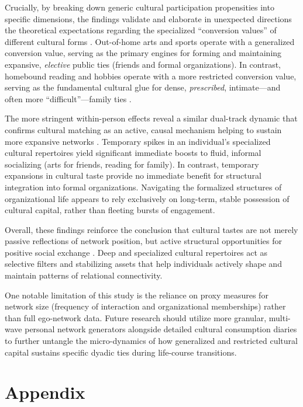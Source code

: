 \documentclass[
]{article}
\begin{document}
Crucially, by breaking down generic cultural participation propensities into specific dimensions, the findings validate and elaborate in unexpected directions the theoretical expectations regarding the specialized ``conversion values'' of different cultural forms \citep{lizardo2011, cebula2024structure-f21}. Out-of-home arts and sports operate with a generalized conversion value, serving as the primary engines for forming and maintaining expansive, \emph{elective} public ties (friends and formal organizations). In contrast, homebound reading and hobbies operate with a more restricted conversion value, serving as the fundamental cultural glue for dense, \emph{prescribed}, intimate---and often more ``difficult''---family ties \citep{offer2018difficult-67c}.

The more stringent within-person effects reveal a similar dual-track dynamic that confirms cultural matching as an active, causal mechanism helping to sustain more expansive networks \citep{vaisey2010, lewis2018conversion-9be, jaeger2026}. Temporary spikes in an individual's specialized cultural repertoires yield significant immediate boosts to fluid, informal socializing (arts for friends, reading for family). In contrast, temporary expansions in cultural taste provide no immediate benefit for structural integration into formal organizations. Navigating the formalized structures of organizational life appears to rely exclusively on long-term, stable possession of cultural capital, rather than fleeting bursts of engagement.

Overall, these findings reinforce the conclusion that cultural tastes are not merely passive reflections of network position, but active structural opportunities for positive social exchange \citep{vanzella2022, puetz2015}. Deep and specialized cultural repertoires act as selective filters and stabilizing assets that help individuals actively shape and maintain patterns of relational connectivity. 

One notable limitation of this study is the reliance on proxy measures for network size (frequency of interaction and organizational memberships) rather than full ego-network data. Future research should utilize more granular, multi-wave personal network generators \citep[e.g.,][]{hollstein2023, vacchiano2024} alongside detailed cultural consumption diaries to further untangle the micro-dynamics of how generalized and restricted cultural capital sustains specific dyadic ties during life-course transitions.

\newpage



\newpage
\section*{Appendix}

\end{document}
